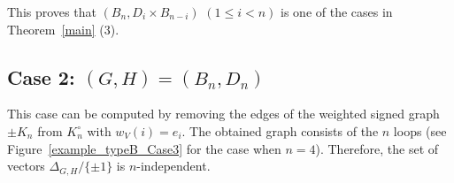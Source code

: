\documentclass{amsart}
\theoremstyle{definition}
\theoremstyle{remark}
\numberwithin{equation}{section}
\begin{document}
This proves that $(B_{n},D_{i}\times B_{n-i})$ $(1\le i< n)$ is one of the cases in Theorem~\ref{main} (3).


\subsection{Case 2: $(G,H)=(B_{n},D_{n})$}
\label{sect:6.2}

This case can be computed by removing the edges of the weighted signed graph $\pm K_{n}$ from $K_{n}^{\circ}$ with $w_{V}(i)=e_{i}$.
The obtained graph consists of the $n$ loops (see Figure~\ref{example_typeB_Case3} for the case when $n=4$).
Therefore, the set of vectors $\Delta_{G,H}/\{\pm 1\}$ is $n$-independent.
\end{document}
